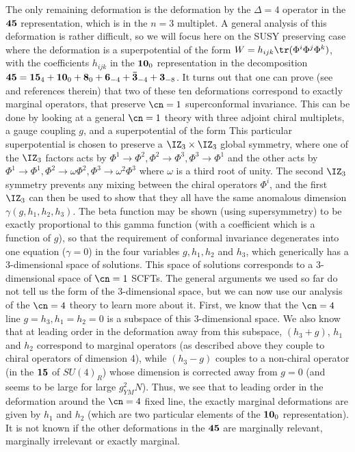  The only remaining deformation is the deformation by the $\Delta=4$
 operator in the $\bf 45$ representation, which is in the $n=3$
 multiplet. A general analysis of this deformation is rather difficult,
 so we will focus here on the SUSY preserving case where the
 deformation is a superpotential of the form $W = h_{ijk} \tr(\Phi^i
 \Phi^j \Phi^k)$, with the coefficients $h_{ijk}$ in the ${\bf 10}_0$
 representation in the decomposition ${\bf 45} = {\bf 15}_4+{\bf
 10}_0+{\bf 8}_0+{\bf 6}_{-4}+{\bf {\bar 3}}_{-4}+{\bf 3}_{-8}$. It
 turns out that one can prove (see \cite{Leigh:1995ep} 
 and references therein) that two of these ten deformations
 correspond to exactly marginal operators, that preserve $\cn=1$
 superconformal invariance. This can be done by looking at a general
 $\cn=1$ theory with three adjoint chiral multiplets, a gauge coupling
 $g$, and a superpotential of the form
 This particular superpotential is chosen to preserve a $\IZ_3\times
 \IZ_3$ global symmetry, where one of the $\IZ_3$ factors acts by
 $\Phi^1 \to \Phi^2, \Phi^2 \to \Phi^3, \Phi^3 \to \Phi^1$ and the
 other acts by $\Phi^1 \to \Phi^1, \Phi^2 \to \omega \Phi^2, \Phi^3
 \to \omega^2 \Phi^3$ where $\omega$ is a third root of unity. The
 second $\IZ_3$ symmetry prevents any mixing between the chiral
 operators $\Phi^i$, and the first $\IZ_3$ can then be used to show
 that they all have the same anomalous dimension
 $\gamma(g,h_1,h_2,h_3)$. The beta function may be shown (using
 supersymmetry) to be exactly proportional to this gamma function
 (with a coefficient which is a function of $g$), so that the
 requirement of conformal invariance degenerates into one equation
 ($\gamma=0$) in the four variables $g,h_1,h_2$ and $h_3$, which
 generically has a 3-dimensional space of solutions. This space of
 solutions corresponds to a 3-dimensional space of $\cn=1$ SCFTs. The
 general arguments we used so far do not tell us the form of the
 3-dimensional space, but we can now use our analysis of the $\cn=4$
 theory to learn more about it. First, we know that the $\cn=4$ line
 $g=h_3, h_1=h_2=0$ is a subspace of this 3-dimensional space. We also
 know that at leading order in the deformation away from this
 subspace, $(h_3+g)$, $h_1$ and $h_2$ correspond to marginal operators
 (as described above they couple to chiral operators of dimension 4),
 while $(h_3-g)$ couples to a non-chiral operator (in the $\bf 15$ of
 $SU(4)_R$) whose dimension is corrected away from $g=0$ (and seems to
 be large for large $g_{YM}^2 N$). Thus, we see that to leading order
 in the deformation around the $\cn=4$ fixed line, the exactly
 marginal deformations are given by $h_1$ and $h_2$ (which are two
 particular elements of the ${\bf 10}_0$ representation). It is not
 known if the other deformations in the $\bf 45$ are marginally
 relevant, marginally irrelevant or exactly marginal.

